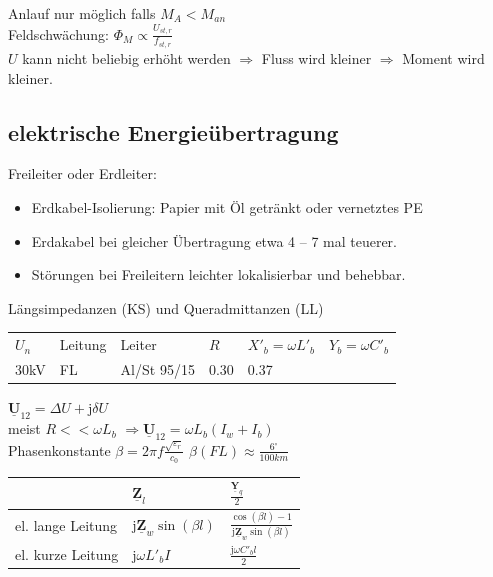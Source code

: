\documentclass[6pt,a4paper]{scrartcl}
\renewcommand{\vec}[1]{\ensuremath{\underline{\boldsymbol {#1}}}}
\renewcommand{\i}{\ensuremath{\mathrm{j}}}										%
\newcommand{\Ra}[0]{\ensuremath{\Rightarrow}}									%
\begin{document}
\begin{multicols}{4}
		Anlauf nur möglich falls $M_A < M_{an}$\\

		Feldschwächung: $\Phi_M \propto \frac{U_{st,r}}{f_{st,r}}$\\
		$U$ kann nicht beliebig erhöht werden $\Ra$ Fluss wird kleiner $\Ra$ Moment wird kleiner.\\
		
		
		
	\subsection{elektrische Energieübertragung}
	Freileiter oder Erdleiter:\\
	\begin{itemize}
		\item Erdkabel-Isolierung: Papier mit Öl getränkt oder vernetztes PE
		\item Erdakabel bei gleicher Übertragung etwa 4 -- 7 mal teuerer.
		\item Störungen bei Freileitern leichter lokalisierbar und behebbar.\\
	\end{itemize}
	Längsimpedanzen (KS) und Queradmittanzen (LL)

	\begin{tabular}{llllll}
		$U_n$ & Leitung & Leiter & $R$ & $X'_b = \omega L'_b$ & $Y_b = \omega C'_b$ \\
		30kV & FL & Al/St 95/15 & 0.30 & 0.37 & \\
	\end{tabular}

	$\vec U_{12} = \Delta U + \i \delta U$\\
	meist $R << \omega L_b$ \quad $\Ra \vec U_{12} = \omega L_b (I_w + I_b)$\\

	Phasenkonstante $\beta = 2 \pi f \frac{\sqrt{\varepsilon_r}}{c_0}$ \qquad $\beta(FL) \approx \frac{6^\circ}{100km}$\\
	
	\begin{tabular}{lll}
	& $\vec Z_l$ & $\frac{\vec Y_q}{2}$\\[0.5em] \midrule
	el. lange Leitung & $\i \vec Z_w \sin(\beta l)$ & $\frac{\cos(\beta l) -1}{\i \vec Z_w \sin(\beta l)}$\\[0.5em]
	el. kurze Leitung & $\i \omega L'_b I$ & $\frac{\i \omega C'_b l}{2}$\\[0.5em]
	\end{tabular}


\end{multicols}
\end{document}
